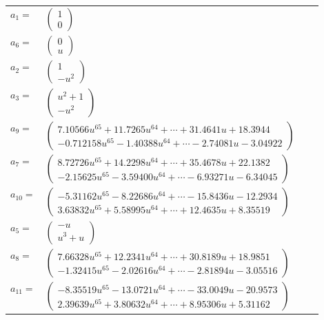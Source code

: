 \documentclass[1p]{elsarticle_modified}
\theoremstyle{definition}
\begin{document}
\begin{tabular}{m{7pt} m{180pt} m{7pt} m{180pt} }
\flushright $a_{1}=$&$\begin{pmatrix}1\\0\end{pmatrix}$ \\
\flushright $a_{6}=$&$\begin{pmatrix}0\\u\end{pmatrix}$ \\
\flushright $a_{2}=$&$\begin{pmatrix}1\\- u^2\end{pmatrix}$ \\
\flushright $a_{3}=$&$\begin{pmatrix}u^2+1\\- u^2\end{pmatrix}$ \\
\flushright $a_{9}=$&$\begin{pmatrix}7.10566 u^{65}+11.7265 u^{64}+\cdots+31.4641 u+18.3944\\-0.712158 u^{65}-1.40388 u^{64}+\cdots-2.74081 u-3.04922\end{pmatrix}$ \\
\flushright $a_{7}=$&$\begin{pmatrix}8.72726 u^{65}+14.2298 u^{64}+\cdots+35.4678 u+22.1382\\-2.15625 u^{65}-3.59400 u^{64}+\cdots-6.93271 u-6.34045\end{pmatrix}$ \\
\flushright $a_{10}=$&$\begin{pmatrix}-5.31162 u^{65}-8.22686 u^{64}+\cdots-15.8436 u-12.2934\\3.63832 u^{65}+5.58995 u^{64}+\cdots+12.4635 u+8.35519\end{pmatrix}$ \\
\flushright $a_{5}=$&$\begin{pmatrix}- u\\u^3+u\end{pmatrix}$ \\
\flushright $a_{8}=$&$\begin{pmatrix}7.66328 u^{65}+12.2341 u^{64}+\cdots+30.8189 u+18.9851\\-1.32415 u^{65}-2.02616 u^{64}+\cdots-2.81894 u-3.05516\end{pmatrix}$ \\
\flushright $a_{11}=$&$\begin{pmatrix}-8.35519 u^{65}-13.0721 u^{64}+\cdots-33.0049 u-20.9573\\2.39639 u^{65}+3.80632 u^{64}+\cdots+8.95306 u+5.31162\end{pmatrix}$ \\

\end{tabular}
\end{document}
